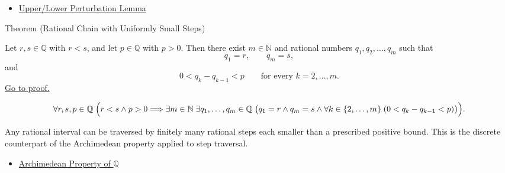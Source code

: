 \begin{dependencies}
\begin{itemize}
  \item \hyperref[lem:rational-upper-lower-perturbation]{Upper/Lower Perturbation Lemma}
\end{itemize}
\end{dependencies}

\begin{theorembox}{Theorem (Rational Chain with Uniformly Small Steps)}
\begin{theorem}
\label{thm:rational-chain-with-small-steps}
Let $r,s\in\mathbb{Q}$ with $r<s$, and let $p\in\mathbb{Q}$ with $p>0$.
Then there exist $m\in\mathbb{N}$ and rational numbers
$q_1,q_2,\dots,q_m$ such that
\[
q_1=r,\qquad q_m=s,
\]
and
\[
0<q_k-q_{k-1}<p
\qquad\text{for every }k=2,\dots,m.
\]
\hyperref[prf:rational-chain-with-small-steps]{Go to proof.}
\end{theorem}
\end{theorembox}

\begin{remark*}
\[
\forall r,s,p\in\mathbb{Q}\;
\Bigl(
r<s \land p>0
\Longrightarrow
\exists m\in\mathbb{N}\;\exists q_1,\dots,q_m\in\mathbb{Q}\;
\bigl(q_1=r \land q_m=s \land
\forall k\in\{2,\dots,m\}\;(0<q_k-q_{k-1}<p)\bigr)
\Bigr).
\]
\end{remark*}

\begin{remark*}[Interpretation]
Any rational interval can be traversed by finitely many rational steps each
smaller than a prescribed positive bound. This is the discrete counterpart of
the Archimedean property applied to step traversal.
\end{remark*}

\begin{dependencies}
\begin{itemize}
  \item \hyperref[thm:archimedean-q]{Archimedean Property of $\mathbb{Q}$}
\end{itemize}
\end{dependencies}
